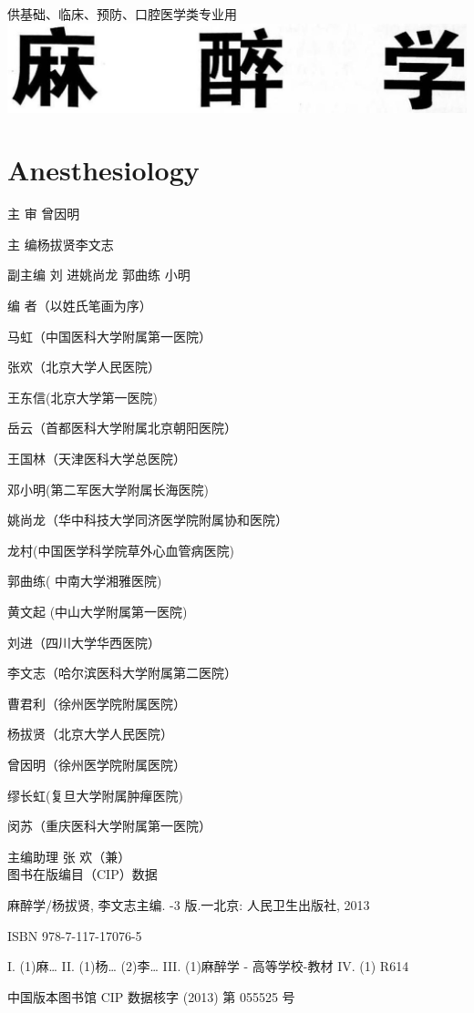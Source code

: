 \documentclass[10pt]{article}
\begin{document}
供基础、临床、预防、口腔医学类专业用\\
\includegraphics[max width=\textwidth, center]{2024_07_09_002a177993bd97d1d6d7g-002}

\section*{Anesthesiology }
主 审 曾因明

主 编杨拔贤李文志

副主编 刘 进姚尚龙 郭曲练 小明

编 者（以姓氏笔画为序）

马虹（中国医科大学附属第一医院）

张欢（北京大学人民医院）

王东信(北京大学第一医院)

岳云（首都医科大学附属北京朝阳医院）

王国林（天津医科大学总医院）

邓小明(第二军医大学附属长海医院)

姚尚龙（华中科技大学同济医学院附属协和医院）

龙村(中国医学科学院草外心血管病医院)

郭曲练( 中南大学湘雅医院)

黄文起 (中山大学附属第一医院)

刘进（四川大学华西医院）

李文志（哈尔滨医科大学附属第二医院）

曹君利（徐州医学院附属医院）

杨拔贤（北京大学人民医院）

曾因明（徐州医学院附属医院）

缪长虹(复旦大学附属肿癉医院)

闵苏（重庆医科大学附属第一医院）

主编助理 张 欢（兼）\\
图书在版编目（CIP）数据

麻醉学/杨拔贤, 李文志主编. -3 版.一北京: 人民卫生出版社, 2013

ISBN 978-7-117-17076-5

I. (1)麻… II. (1)杨… (2)李… III. (1)麻醉学 - 高等学校-教材 IV. (1) R614

中国版本图书馆 CIP 数据核字 (2013) 第 055525 号
\end{document}
